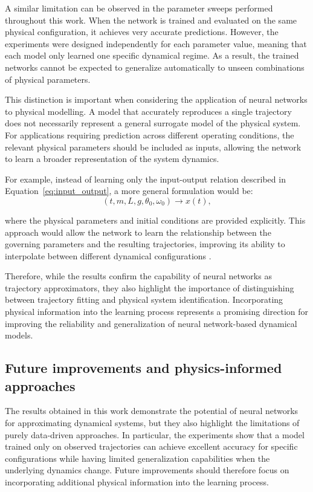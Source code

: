 A similar limitation can be observed in the parameter sweeps performed throughout this work. When the network is trained and evaluated on the same physical configuration, it achieves very accurate predictions. However, the experiments were designed independently for each parameter value, meaning that each model only learned one specific dynamical regime. As a result, the trained networks cannot be expected to generalize automatically to unseen combinations of physical parameters.

This distinction is important when considering the application of neural networks to physical modelling. A model that accurately reproduces a single trajectory does not necessarily represent a general surrogate model of the physical system. For applications requiring prediction across different operating conditions, the relevant physical parameters should be included as inputs, allowing the network to learn a broader representation of the system dynamics.

For example, instead of learning only the input-output relation described in Equation~\ref{eq:input_output}, a more general formulation would be:
\begin{equation}
    (t,m,L,g,\theta_0,\omega_0) \rightarrow x(t),
\end{equation}

where the physical parameters and initial conditions are provided explicitly. This approach would allow the network to learn the relationship between the governing parameters and the resulting trajectories, improving its ability to interpolate between different dynamical configurations \cite{lu2021learning}.

Therefore, while the results confirm the capability of neural networks as trajectory approximators, they also highlight the importance of distinguishing between trajectory fitting and physical system identification. Incorporating physical information into the learning process represents a promising direction for improving the reliability and generalization of neural network-based dynamical models.

\subsection{Future improvements and physics-informed approaches}
The results obtained in this work demonstrate the potential of neural networks for approximating dynamical systems, but they also highlight the limitations of purely data-driven approaches. In particular, the experiments show that a model trained only on observed trajectories can achieve excellent accuracy for specific configurations while having limited generalization capabilities when the underlying dynamics change. Future improvements should therefore focus on incorporating additional physical information into the learning process.

